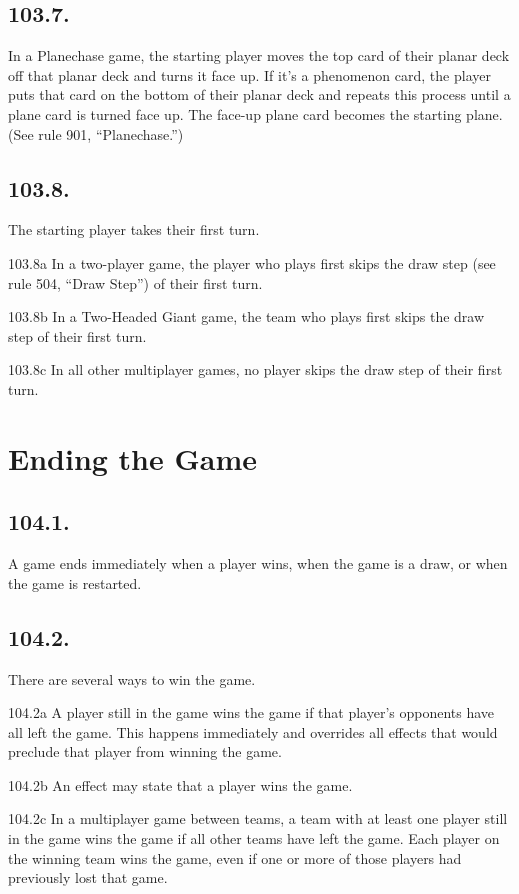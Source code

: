 \subsection*{103.7.}
In a Planechase game, the starting player moves the top card of their planar deck off that planar deck and turns it face up. If it’s a phenomenon card, the player puts that card on the bottom of their planar deck and repeats this process until a plane card is turned face up. The face-up plane card becomes the starting plane. (See rule 901, “Planechase.”)

\subsection*{103.8.}
The starting player takes their first turn.

103.8a In a two-player game, the player who plays first skips the draw step (see rule 504, “Draw Step”) of their first turn.

103.8b In a Two-Headed Giant game, the team who plays first skips the draw step of their first turn.

103.8c In all other multiplayer games, no player skips the draw step of their first turn.

\section{Ending the Game}
\subsection*{104.1.}
A game ends immediately when a player wins, when the game is a draw, or when the game is restarted.

\subsection*{104.2.}
There are several ways to win the game.

104.2a A player still in the game wins the game if that player’s opponents have all left the game. This happens immediately and overrides all effects that would preclude that player from winning the game.

104.2b An effect may state that a player wins the game.

104.2c In a multiplayer game between teams, a team with at least one player still in the game wins the game if all other teams have left the game. Each player on the winning team wins the game, even if one or more of those players had previously lost that game.

